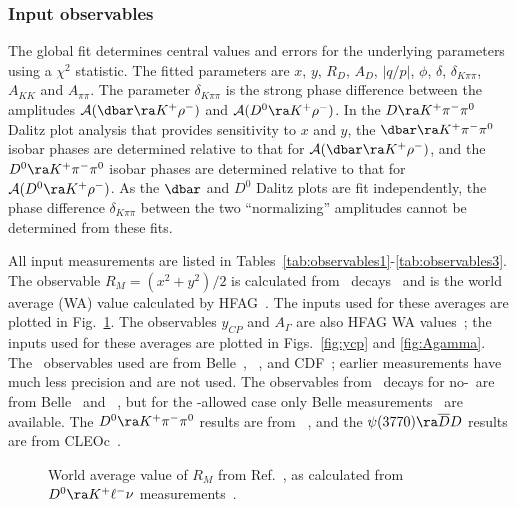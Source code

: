 \subsubsection{Input observables}

The global fit determines central values and errors for
the underlying parameters using a $\chi^2$ statistic.
The fitted parameters are 
$x$, $y$, $R^{}_D$, $A^{}_D$, $|q/p|$, $\phi$, $\delta$, $\delta^{}_{K\pi\pi}$,
$A^{}_{KK}$ and $A^{}_{\pi\pi}$.
The parameter $\delta^{}_{K\pi\pi}$ is the strong phase 
difference between the amplitudes ${\cal A}(\dbar\ra K^+\rho^-)$ 
and ${\cal A}(D^0\ra K^+\rho^-)$. In the $D\ra K^+\pi^-\pi^0$ 
Dalitz plot analysis that provides sensitivity to $x$ and $y$, 
the $\dbar\ra K^+\pi^-\pi^0$ isobar phases are determined 
relative to that for ${\cal A}(\dbar\ra K^+\rho^-)$, and 
the $D^0\ra K^+\pi^-\pi^0$ isobar phases are determined 
relative to that for ${\cal A}(D^0\ra K^+\rho^-)$. 
As the $\dbar$ and $D^0$ Dalitz plots are fit independently, 
the phase difference $\delta^{}_{K\pi\pi}$ between the
two ``normalizing'' amplitudes cannot be determined
from these fits.

All input measurements are listed in 
Tables~\ref{tab:observables1}-\ref{tab:observables3}. 
The observable $R^{}_M=(x^2+y^2)/2$ is calculated from \dklnu\ 
decays~\cite{Aitala:1996vz,Cawlfield:2005ze,Aubert:2007aa,Bitenc:2008bk}
and is the world average (WA) value calculated by HFAG~\cite{HFAG_charm:webpage}.
The inputs used for these averages are plotted in Fig.~\ref{fig:rm_semi}. 
The observables $y^{}_{CP}$ and $A^{}_\Gamma$ are also HFAG WA 
values~\cite{HFAG_charm:webpage}; the inputs used for these 
averages are plotted in Figs.~\ref{fig:ycp} and \ref{fig:Agamma}.
The \dkpi\ observables used are from Belle~\cite{Zhang:2006dp}, 
\babar~\cite{Aubert:2007wf}, and CDF~\cite{Aaltonen:2007uc};
earlier measurements have much less precision and are not used.
The observables from \dkspp\ decays for no-\cpv\ are from 
Belle~\cite{Abe:2007rd} and \babar~\cite{delAmoSanchez:2010xz}, 
but for the \cpv-allowed case only Belle measurements~\cite{Abe:2007rd} 
are available. The $D^0\ra K^+\pi^-\pi^0$ results are from 
\babar~\cite{Aubert:2008zh}, and the $\psi(3770)\ra\overline{D}D$ 
results are from CLEOc~\cite{Sun:2010zz}.


\begin{figure}
\begin{center}
\end{center}
\vskip-0.20in
\caption{\label{fig:rm_semi}
World average value of $R^{}_M$ from Ref.~\cite{HFAG_charm:webpage},
as calculated from $D^0\ra K^+\ell^-\nu$ 
measurements~\cite{Aitala:1996vz,Cawlfield:2005ze,Aubert:2007aa,Bitenc:2008bk}. }
\end{figure}

